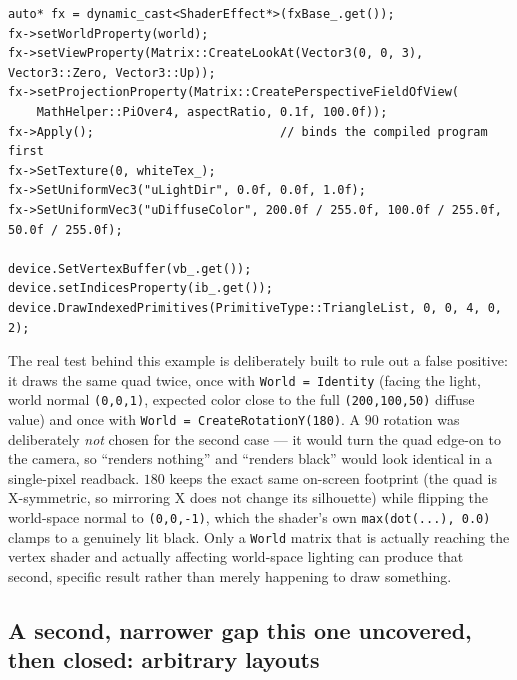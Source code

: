 \begin{lstlisting}
auto* fx = dynamic_cast<ShaderEffect*>(fxBase_.get());
fx->setWorldProperty(world);
fx->setViewProperty(Matrix::CreateLookAt(Vector3(0, 0, 3), Vector3::Zero, Vector3::Up));
fx->setProjectionProperty(Matrix::CreatePerspectiveFieldOfView(
    MathHelper::PiOver4, aspectRatio, 0.1f, 100.0f));
fx->Apply();                          // binds the compiled program first
fx->SetTexture(0, whiteTex_);
fx->SetUniformVec3("uLightDir", 0.0f, 0.0f, 1.0f);
fx->SetUniformVec3("uDiffuseColor", 200.0f / 255.0f, 100.0f / 255.0f, 50.0f / 255.0f);

device.SetVertexBuffer(vb_.get());
device.setIndicesProperty(ib_.get());
device.DrawIndexedPrimitives(PrimitiveType::TriangleList, 0, 0, 4, 0, 2);
\end{lstlisting}

The real test behind this example is deliberately built to rule out a false positive: it
draws the same quad twice, once with \texttt{World = Identity} (facing the light, world
normal \texttt{(0,0,1)}, expected color close to the full \texttt{(200,100,50)} diffuse
value) and once with \texttt{World = CreateRotationY(180\textdegree{})}. A
\(90\)\textdegree{} rotation was deliberately \emph{not} chosen for the second case ---
it would turn the quad edge-on to the camera, so ``renders nothing'' and ``renders
black'' would look identical in a single-pixel readback. \(180\)\textdegree{} keeps the
exact same on-screen footprint (the quad is X-symmetric, so mirroring X does not change
its silhouette) while flipping the world-space normal to \texttt{(0,0,-1)}, which the
shader's own \texttt{max(dot(...), 0.0)} clamps to a genuinely lit black. Only a
\texttt{World} matrix that is actually reaching the vertex shader and actually affecting
world-space lighting can produce that second, specific result rather than merely happening
to draw something.

\subsection{A second, narrower gap this one uncovered, then closed: arbitrary layouts}

